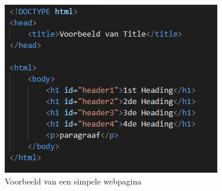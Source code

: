 \begin{figure}[b]
    \centering
    \includegraphics{bachproef/graphics/figuur 1.1.png}
    \caption{Voorbeeld van een simpele webpagina}
    \label{fig:figuur 1.1.png}
\end{figure}

